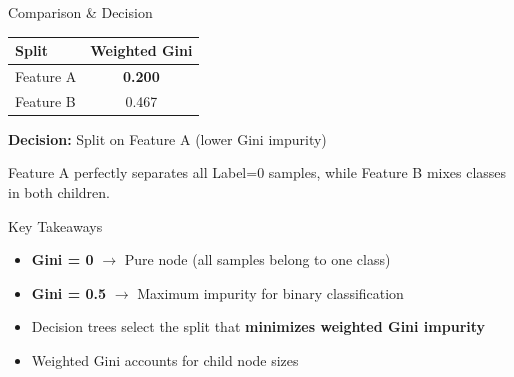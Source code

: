 \documentclass{beamer}
\begin{document}
\begin{frame}{Comparison \& Decision}

\centering
\begin{tabular}{lc}
\toprule
Split & Weighted Gini \\
\midrule
Feature A & \textbf{0.200} \\
Feature B & 0.467 \\
\bottomrule
\end{tabular}

\vspace{1.5em}

\pause

\textbf{Decision:} Split on Feature A (lower Gini impurity)

\vspace{1em}

Feature A perfectly separates all Label=0 samples, while Feature B mixes classes in both children.

\end{frame}

\begin{frame}{Key Takeaways}

\begin{itemize}
\item \textbf{Gini = 0} $\rightarrow$ Pure node (all samples belong to one class)

\vspace{0.5em}

\item \textbf{Gini = 0.5} $\rightarrow$ Maximum impurity for binary classification

\vspace{0.5em}

\item Decision trees select the split that \textbf{minimizes weighted Gini impurity}

\vspace{0.5em}

\item Weighted Gini accounts for child node sizes
\end{itemize}

\end{frame}
\end{document}
